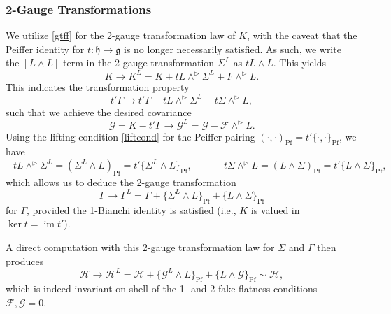 \documentclass[onecolumn]{article}
\theoremstyle{theorem}
\theoremstyle{remark}
\theoremstyle{example}
\theoremstyle{definition}
\numberwithin{equation}{section}
\def\g{\mathfrak g}
\def\h{\mathfrak h}
\begin{document}
\subsubsection{2-Gauge Transformations} 
We utilize \eqref{gtff} for the 2-gauge transformation law of $K$, with the caveat that the Peiffer identity for $t:\h\rightarrow\g$ is no longer necessarily satisfied. As such, we write the $[L\wedge L]$ term in the 2-gauge transformation $\Sigma^L$ as $tL\wedge L$. This yields
\begin{equation}
    K\rightarrow K^L = K + tL\wedge^\rhd \Sigma^L + F\wedge^\rhd L.\nonumber
\end{equation}
{This} indicates the transformation property
\begin{equation}
    t'\Gamma\rightarrow  t'\Gamma -tL\wedge^\rhd \Sigma^L -t\Sigma\wedge^\rhd L,\nonumber
\end{equation}
such that we achieve the desired covariance
\begin{equation}
    \mathcal{G}=K - t'\Gamma\rightarrow \mathcal{G}^L = \mathcal{G} - \mathcal{F}\wedge^\rhd L.\label{2fakecurv2gau}
\end{equation}
{Using} the lifting condition \eqref{liftcond} for the Peiffer pairing $(\cdot,\cdot)_\text{Pf}=t'\{\cdot,\cdot\}_\text{Pf}$, we have
\begin{equation}
    -tL\wedge^\rhd \Sigma^L  = (\Sigma^L\wedge L)_\text{Pf} = t'\{\Sigma^L\wedge L\}_\text{Pf},\qquad -t\Sigma\wedge^\rhd L = (L\wedge \Sigma)_\text{Pf} = t'\{L\wedge \Sigma\}_\text{Pf},\nonumber
\end{equation}
which allows us to deduce the 2-gauge transformation 
\begin{equation}
    \Gamma\rightarrow\Gamma^L = \Gamma+\{\Sigma^L\wedge L\}_\text{Pf} + \{L\wedge \Sigma\}_\text{Pf}\nonumber
\end{equation}
for $\Gamma$, provided the 1-Bianchi identity is satisfied (i.e., $K$ is valued in $\operatorname{ker}t = \operatorname{im}t'$).

A direct computation with this 2-gauge transformation law for $\Sigma$ and $\Gamma$ then produces~\cite{Radenkovic:2021fqq}
\begin{equation}
    \mathcal{H}\rightarrow \mathcal{H}^L = \mathcal{H} + \{\mathcal{G}^L\wedge L\}_\text{Pf} +\{L\wedge\mathcal{G}\}_\text{Pf}\sim \mathcal{H}\label{3curv2gau},\nonumber
\end{equation}
which is indeed  invariant on-shell of the 1- and 2-fake-flatness conditions $\mathcal{F},\mathcal{G}=0$.
\end{document}
